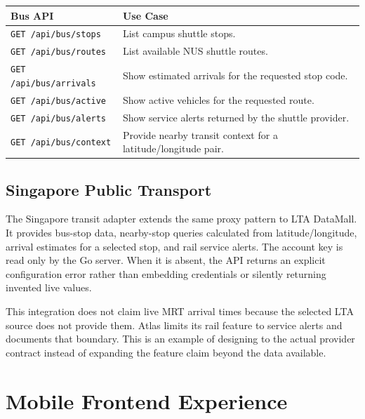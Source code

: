 \documentclass[11pt]{article}
\begin{document}
\begin{center}
\renewcommand{\arraystretch}{1.35}
\begin{tabularx}{\textwidth}{|L{0.30\textwidth}|X|}
\hline
\textbf{Bus API} & \textbf{Use Case} \\
\hline
\texttt{GET /api/bus/stops} & List campus shuttle stops. \\
\hline
\texttt{GET /api/bus/routes} & List available NUS shuttle routes. \\
\hline
\texttt{GET /api/bus/arrivals} & Show estimated arrivals for the requested stop code. \\
\hline
\texttt{GET /api/bus/active} & Show active vehicles for the requested route. \\
\hline
\texttt{GET /api/bus/alerts} & Show service alerts returned by the shuttle provider. \\
\hline
\texttt{GET /api/bus/context} & Provide nearby transit context for a latitude/longitude pair. \\
\hline
\end{tabularx}
\end{center}

\subsection*{Singapore Public Transport}

The Singapore transit adapter extends the same proxy pattern to LTA DataMall. It provides bus-stop data, nearby-stop queries calculated from latitude/longitude, arrival estimates for a selected stop, and rail service alerts. The account key is read only by the Go server. When it is absent, the API returns an explicit configuration error rather than embedding credentials or silently returning invented live values.

This integration does not claim live MRT arrival times because the selected LTA source does not provide them. Atlas limits its rail feature to service alerts and documents that boundary. This is an example of designing to the actual provider contract instead of expanding the feature claim beyond the data available.

\newpage

\section*{Mobile Frontend Experience}
\end{document}
